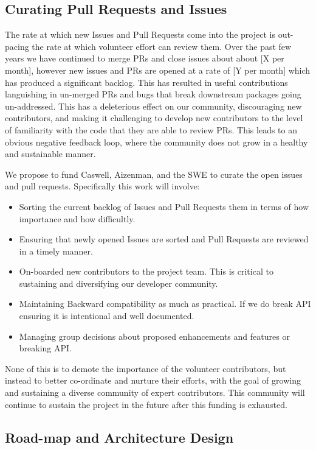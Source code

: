 \documentclass[11pt]{article}  %
\begin{document}
\subsection{Curating Pull Requests and Issues}

The rate at which new Issues and Pull Requests come into the project
is out-pacing the rate at which volunteer effort can review them.
Over the past few years we have continued to merge PRs and close
issues about about [X per month], however new issues and PRs are opened
at a rate of [Y per month] which has produced a significant backlog.
This has resulted in useful contributions languishing in un-merged PRs
and bugs that break downstream packages going un-addressed.  This has
a deleterious effect on our community, discouraging new contributors,
and making it challenging to develop new contributors to the level of
familiarity with the code that they are able to review PRs. This leads
to an obvious negative feedback loop, where the community does not
grow in a healthy and sustainable manner.

We propose to fund Caswell, Aizenman, and the SWE to curate the open
issues and pull requests.  Specifically this work will involve:

\begin{itemize}
\item Sorting the current backlog of Issues and Pull Requests
  them in terms of how importance and how difficultly.
\item Ensuring that newly opened Issues are sorted and Pull Requests
  are reviewed in a timely manner.
\item On-boarded new contributors to the project team.  This is
  critical to sustaining and diversifying our developer community.
\item Maintaining Backward compatibility as much as practical.  If we
  do break API ensuring it is intentional and well documented.
\item Managing group decisions about proposed enhancements and
  features or breaking API.
\end{itemize}

None of this is to demote the importance of the volunteer
contributors, but instead to better co-ordinate and nurture their
efforts, with the goal of growing and sustaining a diverse community
of expert contributors.  This community will continue to sustain the
project in the future after this funding is exhausted.

\subsection{Road-map and Architecture Design}
\end{document}
